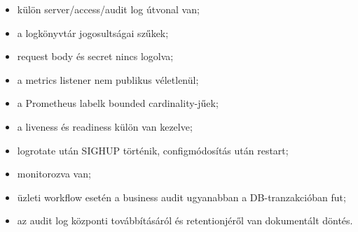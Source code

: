 \begin{itemize}
  \item külön server/access/audit log útvonal van;
  \item a logkönyvtár jogosultságai szűkek;
  \item request body és secret nincs logolva;
  \item a metrics listener nem publikus véletlenül;
  \item a Prometheus labelk bounded cardinality-jűek;
  \item a liveness és readiness külön van kezelve;
  \item logrotate után SIGHUP történik, configmódosítás után restart;
  \item {} monitorozva van;
  \item üzleti workflow esetén a business audit ugyanabban a DB-tranzakcióban fut;
  \item az audit log központi továbbításáról és retentionjéről van dokumentált döntés.
\end{itemize}
